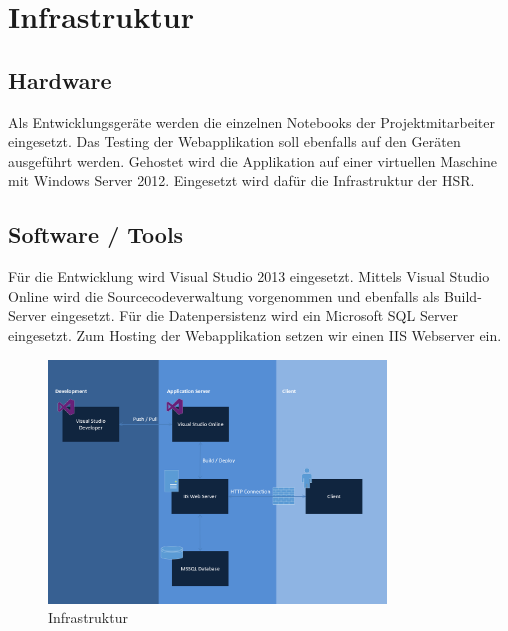 \chapter{Infrastruktur}

\section{Hardware}
Als Entwicklungsgeräte werden die einzelnen Notebooks der Projektmitarbeiter eingesetzt. Das Testing der Webapplikation soll ebenfalls auf den Geräten ausgeführt werden. Gehostet wird die Applikation auf einer virtuellen Maschine mit Windows Server 2012. Eingesetzt wird dafür die Infrastruktur der HSR.

\section{Software / Tools}
Für die Entwicklung wird Visual Studio 2013 eingesetzt. Mittels Visual Studio Online wird die Sourcecodeverwaltung vorgenommen und ebenfalls als Build-Server eingesetzt. Für die Datenpersistenz wird ein Microsoft SQL Server eingesetzt. Zum Hosting der Webapplikation setzen wir einen IIS Webserver ein.
\begin{figure}[h]
    \centering
    \includegraphics[width=0.8\textwidth]{content/images/infrastruktur.png}
    \caption{Infrastruktur}
\end{figure}

